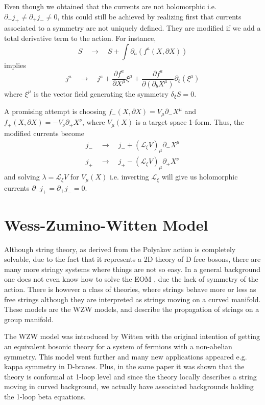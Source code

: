 \documentclass[a4paper,12pt]{article}
\numberwithin{equation}{section}
\numberwithin{thm}{section}
\numberwithin{exm}{section}
\newcommand{\p}{\partial}
\newcommand{\lag}{\mathcal L}
\newcommand{\lra}{\longrightarrow}
\newcommand{\<}{{\langle}}
\renewcommand{\>}{{\rangle}}
\renewcommand{\d}{{\delta}}
\newcommand{\m}{{\mu}}
\newcommand{\n}{{\nu}}
\begin{document}
Even though we obtained that the currents are not holomorphic i.e. $\p_-j_+\neq\p_+j_-\neq0$, this could still be achieved by realizing first that currents associated to a symmetry are not uniquely defined. They are modified if we add a total derivative term to the action. For instance,
	\begin{equation}
	S\quad\lra\quad S + \int \p_a (f^a(X,\p X))
	\end{equation}
implies
	\begin{equation}\label{var_current}
	j^a\quad\lra\quad j^a + \frac{\p f^a}{\p X^\m}\xi^\m + \frac{\p f^a}{\p(\p_b X^\m)}\p_b(\xi^\m)
	\end{equation}
where $\xi^\m$ is the vector field generating the symmetry $\d_\xi S=0$.

A promising attempt is choosing $f_-(X,\p X) = V_\m\p_-X^\m$ and $f_+(X,\p X) = -V_\n\p_+X^\n$, where $V_\m(X)$ is a target space 1-form. Thus, the modified currents become
	\begin{align}
	j_-\quad\rightarrow\quad j_-+(\lag_\xi V)_\mu\p_-X^\mu\\
	j_+\quad\rightarrow\quad j_+-(\lag_\xi V)_\mu\p_+X^\nu
	\end{align}	
and solving $\lambda=\lag_\xi V$ for $V_\mu(X)$ i.e. inverting $\lag_\xi$ will give us holomorphic currents $\p_-j_+=\p_+j_-=0$.



\section{Wess-Zumino-Witten Model}
Although string theory, as derived from the Polyakov action is completely solvable, due to the fact that it represents a 2D theory of D free bosons, there are many more stringy systems where things are not so easy. In a general background one does not even know how to solve the EOM , due the lack of symmetry of the action. There is however a class of theories, where strings behave more or less as free strings although they are interpreted as strings moving on a curved manifold. These models are the WZW models, and describe the propagation of strings on a group manifold.

The WZW model was introduced by Witten \cite{Witten1984} with the original intention of getting an equivalent bosonic theory for a system of fermions with a non-abelian symmetry. This model went further and many new applications appeared e.g. kappa symmetry in D-branes. Plus, in the same paper it was shown that the theory is conformal at 1-loop level and since the theory locally describes a string moving in curved background, we actually have associated backgrounds holding the 1-loop beta equations.
\end{document}
